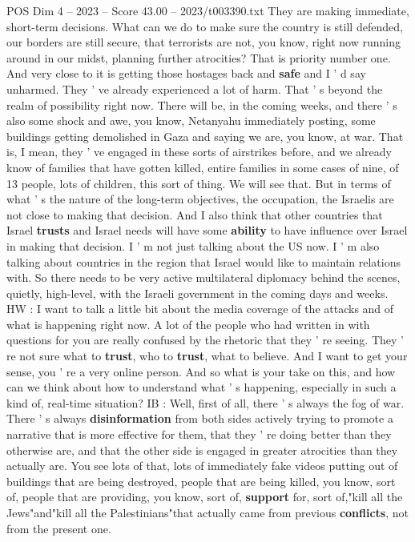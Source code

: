 \begin{textsample}{POS Dim 4 – 2023 – Score 43.00 – 2023/t003390.txt}
They are making immediate, short-term decisions.
What can we do to make sure the country is still defended, our borders are still secure, that terrorists are not, you know, right now running around in our midst, planning further atrocities?
That is priority number one.
And very close to it is getting those hostages back and \textbf{safe} and I ' d say unharmed.
They ' ve already experienced a lot of harm.
That ' s beyond the realm of possibility right now.
There will be, in the coming weeks, and there ' s also some shock and awe, you know, Netanyahu immediately posting, some buildings getting demolished in Gaza and saying we are, you know, at war.
That is, I mean, they ' ve engaged in these sorts of airstrikes before, and we already know of families that have gotten killed, entire families in some cases of nine, of 13 people, lots of children, this sort of thing.
We will see that.
But in terms of what ' s the nature of the long-term objectives, the occupation, the Israelis are not close to making that decision.
And I also think that other countries that Israel \textbf{trusts} and Israel needs will have some \textbf{ability} to have influence over Israel in making that decision.
I ' m not just talking about the US now.
I ' m also talking about countries in the region that Israel would like to maintain relations with.
So there needs to be very active multilateral diplomacy behind the scenes, quietly, high-level, with the Israeli government in the coming days and weeks.
HW : I want to talk a little bit about the media coverage of the attacks and of what is happening right now.
A lot of the people who had written in with questions for you are really confused by the rhetoric that they ' re seeing.
They ' re not sure what to \textbf{trust}, who to \textbf{trust}, what to believe.
And I want to get your sense, you ' re a very online person.
And so what is your take on this, and how can we think about how to understand what ' s happening, especially in such a kind of, real-time situation?
IB : Well, first of all, there ' s always the fog of war.
There ' s always \textbf{disinformation} from both sides actively trying to promote a narrative that is more effective for them, that they ' re doing better than they otherwise are, and that the other side is engaged in greater atrocities than they actually are.
You see lots of that, lots of immediately fake videos putting out of buildings that are being destroyed, people that are being killed, you know, sort of, people that are providing, you know, sort of, \textbf{support} for, sort of,"kill all the Jews"and"kill all the Palestinians"that actually came from previous \textbf{conflicts}, not from the present one.

\end{textsample}
